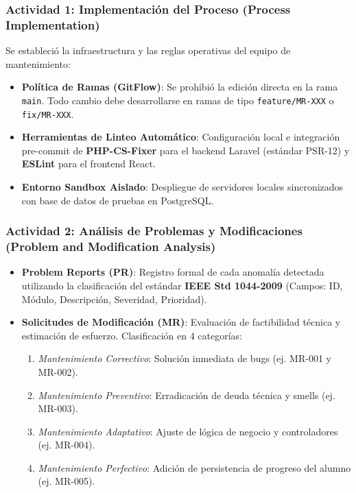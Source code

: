 \documentclass[12pt]{article}
\begin{document}
\subsubsection{Actividad 1: Implementación del Proceso (Process Implementation)}
Se estableció la infraestructura y las reglas operativas del equipo de mantenimiento:
\begin{itemize}
    \item \textbf{Política de Ramas (GitFlow)}: Se prohibió la edición directa en la rama \texttt{main}. Todo cambio debe desarrollarse en ramas de tipo \texttt{feature/MR-XXX} o \texttt{fix/MR-XXX}.
    \item \textbf{Herramientas de Linteo Automático}: Configuración local e integración pre-commit de \textbf{PHP-CS-Fixer} para el backend Laravel (estándar PSR-12) y \textbf{ESLint} para el frontend React.
    \item \textbf{Entorno Sandbox Aislado}: Despliegue de servidores locales sincronizados con base de datos de pruebas en PostgreSQL.
\end{itemize}

\subsubsection{Actividad 2: Análisis de Problemas y Modificaciones (Problem and Modification Analysis)}
\begin{itemize}
    \item \textbf{Problem Reports (PR)}: Registro formal de cada anomalía detectada utilizando la clasificación del estándar \textbf{IEEE Std 1044-2009} (Campos: ID, Módulo, Descripción, Severidad, Prioridad).
    \item \textbf{Solicitudes de Modificación (MR)}: Evaluación de factibilidad técnica y estimación de esfuerzo. Clasificación en 4 categorías:
    \begin{enumerate}[label=\alph*)]
        \item \textit{Mantenimiento Correctivo}: Solución inmediata de bugs (ej. MR-001 y MR-002).
        \item \textit{Mantenimiento Preventivo}: Erradicación de deuda técnica y smells (ej. MR-003).
        \item \textit{Mantenimiento Adaptativo}: Ajuste de lógica de negocio y controladores (ej. MR-004).
        \item \textit{Mantenimiento Perfectivo}: Adición de persistencia de progreso del alumno (ej. MR-005).
    \end{enumerate}
\end{itemize}
\end{document}
